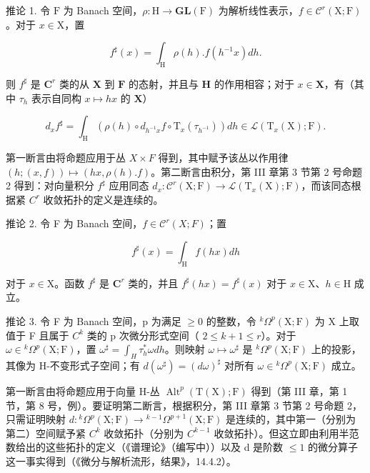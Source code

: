 推论 1. 令 \(\mathrm{F}\) 为 Banach 空间，\(\rho : \mathrm{H} \to \mathbf{GL}(\mathrm{F})\) 为解析线性表示，\(f \in \mathcal{C}^r(\mathrm{X};\mathrm{F})\)。对于 \(x \in \mathrm{X}\)，置

\[
f ^ {\sharp} (x) = \int_ {\mathrm{H}} \rho (h). f (h ^ {- 1} x) d h.
\]

则 \(f^{\sharp}\) 是 \(\mathbf{C}^r\) 类的从 \(\mathbf{X}\) 到 \(\mathbf{F}\) 的态射，并且与 \(\mathbf{H}\) 的作用相容；对于 \(x \in \mathbf{X}\)，有（其中 \(\tau_h\) 表示自同构 \(x \mapsto hx\) 的 \(\mathbf{X}\)）

\[
d _ {x} f ^ {\sharp} = \int_ {\mathrm{H}} (\rho (h) \circ d _ {h ^ {- 1} x} f \circ \mathrm{T} _ {x} (\tau_ {h ^ {- 1}})) d h \in \mathscr {L} (\mathrm{T} _ {x} (\mathrm{X}); \mathrm{F}).\tag{14}
\]

第一断言由将命题应用于丛 \(X \times F\) 得到，其中赋予该丛以作用律 \((h; (x, f)) \mapsto (hx, \rho(h).f)\)。第二断言由积分，第 III 章第 3 节第 2 号命题 2 得到：对向量积分 \(f^{\sharp}\) 应用同态 \(d_{x} : \mathcal{C}^{r}(\mathrm{X};\mathrm{F}) \to \mathcal{L}(\mathrm{T}_{x}(\mathrm{X});\mathrm{F})\)，而该同态根据紧 \(C^{r}\) 收敛拓扑的定义是连续的。

推论 2. 令 F 为 Banach 空间，\(f \in \mathcal{C}^{r}(X;F)\)；置

\[
f ^ {\sharp} (x) = \int_ {\mathrm{H}} f (h x) d h
\]

对于 \(x \in \mathrm{X}\)。函数 \(f^{\sharp}\) 是 \(\mathbf{C}^r\) 类的，并且 \(f^{\sharp}(hx) = f^{\sharp}(x)\) 对于 \(x \in \mathrm{X}\)、\(h \in \mathrm{H}\) 成立。

推论 3. 令 F 为 Banach 空间，p 为满足 \(\geq 0\) 的整数，令 \(^{k}\Omega^{p}(\mathrm{X};\mathrm{F})\) 为 X 上取值于 F 且属于 \(C^{k}\) 类的 p 次微分形式空间（ \(2 \leq k + 1 \leq r\)）。对于 \(\omega \in {}^{k}\Omega^{p}(\mathrm{X};\mathrm{F})\)，置 \(\omega^{\sharp} = \int_{H} \tau_{h}^{*}\omega dh\)。则映射 \(\omega \mapsto \omega^{\sharp}\) 是 \(^{k}\Omega^{p}(\mathrm{X};\mathrm{F})\) 上的投影，其像为 H-不变形式子空间；有 \(d(\omega^{\sharp}) = (d\omega)^{\sharp}\) 对所有 \(\omega \in {}^{k}\Omega^{p}(\mathrm{X};\mathrm{F})\) 成立。

第一断言由将命题应用于向量 H-丛 \(\operatorname{Alt}^{p}(\mathrm{T}(\mathrm{X});\mathrm{F})\) 得到（第 III 章，第 1 节，第 8 号，例）。要证明第二断言，根据积分，第 III 章第 3 节第 2 号命题 2，只需证明映射 \(d:{}^{k}\varOmega^{p}(\mathrm{X};\mathrm{F})\to{}^{k-1}\varOmega^{p+1}(\mathrm{X};\mathrm{F})\) 是连续的，其中第一（分别为第二）空间赋予紧 \(C^{k}\) 收敛拓扑（分别为 \(C^{k-1}\) 收敛拓扑）。但这立即由利用半范数给出的这些拓扑的定义（《谱理论》（编写中））以及 d 是阶数 \(\leq 1\) 的微分算子这一事实得到（《微分与解析流形，结果》，14.4.2）。

